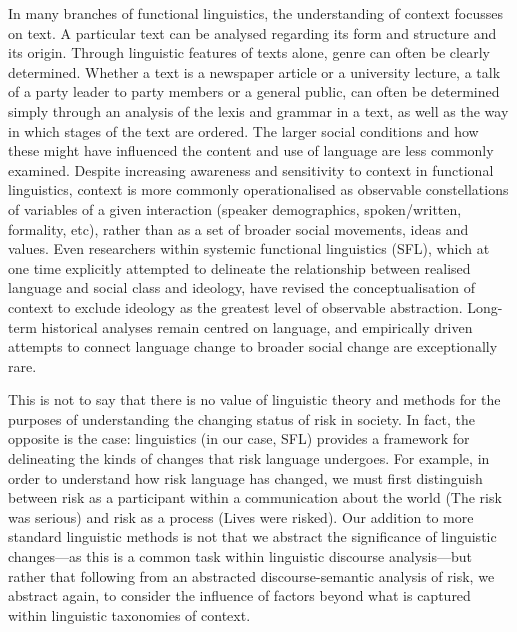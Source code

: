 In many branches of functional linguistics, the understanding of context focusses on text. A particular text can be analysed regarding its form and structure and its origin. Through linguistic features of texts alone, genre can often be clearly determined. Whether a text is a newspaper article or a university lecture, a talk of a party leader to party members or a general public, can often be determined simply through an analysis of the lexis and grammar in a text, as well as the way in which stages of the text are ordered. The larger social conditions and how these might have influenced the content and use of language are less commonly examined. Despite increasing awareness and sensitivity to context in functional linguistics, context is more commonly operationalised as observable constellations of variables of a given interaction (speaker demographics, spoken/written, formality, etc), rather than as a set of broader social movements, ideas and values. Even researchers within systemic functional linguistics (SFL), which at one time explicitly attempted to delineate the relationship between realised language and social class and ideology, have revised the conceptualisation of context to exclude ideology as the greatest level of observable abstraction. Long-term historical analyses remain centred on language, and empirically driven attempts to connect language change to broader social change are exceptionally rare.

This is not to say that there is no value of linguistic theory and methods for the purposes of understanding the changing status of risk in society. In fact, the opposite is the case: linguistics (in our case, SFL) provides a framework for delineating the kinds of changes that risk language undergoes. For example, in order to understand how risk language has changed, we must first distinguish between risk as a participant within a communication about the world (The risk was serious) and risk as a process (Lives were risked). Our addition to more standard linguistic methods is not that we abstract the significance of linguistic changes---as this is a common task within linguistic discourse analysis---but rather that following from an abstracted discourse-semantic analysis of risk, we abstract again, to consider the influence of factors beyond what is captured within linguistic taxonomies of context.

